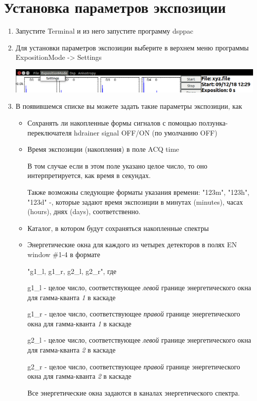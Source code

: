 \documentclass[]{article}
\begin{document}
\section{Установка параметров экспозиции}

\begin{enumerate}
\def\labelenumi{\arabic{enumi}.}
\item
  Запустите Terminal и из него запустите программу dsppac
\item
  Для установки параметров экспозиции выберите в верхнем меню программы
  ExpositionMode -\textgreater{} Settings

  \includegraphics{./imgs/set_FPGA_Select_menu.png}
\item
  В появившемся списке вы можете задать такие параметры экспозиции, как

  \begin{itemize}
  \item
    Сохранять ли накопленные формы сигналов с помощью
    ползунка-переключателя hdrainer signal OFF/ON (по умолчанию OFF)
  \item
    Время экспозиции (накопления) в поле ACQ time

    В том случае если в этом поле указано целое число, то оно
    интерпретируется, как время в секундах.

    Также возможны следующие форматы указания времени: "123m", "123h",
    "123d" -, которые задают время экспозиции в минутах (minutes), часах
    (hours), днях (days), соответственно.
  \item
    Каталог, в котором будут сохраняться накопленные спектры
  \item
    Энергетические окна для каждого из четырех детекторов в полях EN
    window \#1-4 в формате

    "g1\_l, g1\_r, g2\_l, g2\_r", где

    g1\_l - целое число, соответствующее \emph{левой} границе
    энергетического окна для гамма-кванта \emph{1} в каскаде

    g1\_r - целое число, соответствующее \emph{правой} границе
    энергетического окна для гамма-кванта \emph{1} в каскаде

    g2\_l - целое число, соответствующее \emph{левой} границе
    энергетического окна для гамма-кванта \emph{2} в каскаде

    g2\_r - целое число, соответствующее \emph{правой} границе
    энергетического окна для гамма-кванта \emph{2} в каскаде

    Все энергетические окна задаются в каналах энергетического спектра.
  \end{itemize}
\end{enumerate}
\end{document}
